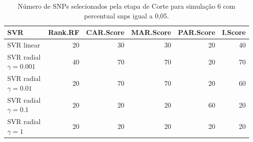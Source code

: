 \begin{table}[ht]
\centering
\begin{tabular}{lrrrrr}
  \hline
SVR & Rank.RF & CAR.Score & MAR.Score & PAR.Score & I.Score \\ 
  \hline
SVR linear & 20 & 30 & 30 & 20 & 40 \\ 
  SVR radial $\gamma = 0.001$ & 40 & 70 & 70 & 20 & 70 \\ 
  SVR radial $\gamma = 0.01$ & 20 & 70 & 70 & 20 & 60 \\ 
  SVR radial $\gamma = 0.1$ & 20 & 20 & 20 & 60 & 20 \\ 
  SVR radial $\gamma = 1$ & 20 & 20 & 20 & 20 & 20 \\ 
   \hline
\end{tabular}
\caption{Número de SNPs selecionados pela etapa de Corte para simulação 6 com percentual snps igual a 0,05.} 
\end{table}
